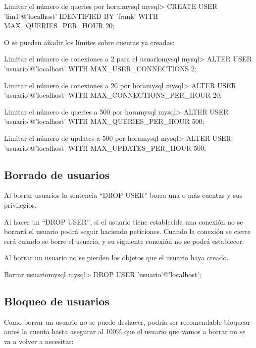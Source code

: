 \begin{mycode}{Limitar el número de queries por hora.}{mysql}{\scriptsize}
mysql> CREATE USER 'lim1'@'localhost' IDENTIFIED BY 'frank' WITH MAX_QUERIES_PER_HOUR 20;
\end{mycode}


O se pueden añadir los límites sobre cuentas ya creadas:


\begin{mycode}{Limitar el número de conexiones a 2 para el usuario}{mysql}{}
mysql> ALTER USER 'usuario'@'localhost' WITH MAX_USER_CONNECTIONS 2;
\end{mycode}

\begin{mycode}{Limitar el número de conexiones a 20 por hora}{mysql}{{\small }}
mysql> ALTER USER 'usuario'@'localhost' WITH MAX_CONNECTIONS_PER_HOUR 20;
\end{mycode}

\begin{mycode}{Limitar el número de queries a 500 por hora}{mysql}{}
mysql> ALTER USER 'usuario'@'localhost' WITH MAX_QUERIES_PER_HOUR 500;
\end{mycode}


\begin{mycode}{Limitar el número de updates a 500 por hora}{mysql}{}
mysql> ALTER USER 'usuario'@'localhost' WITH MAX_UPDATES_PER_HOUR 500;
\end{mycode}


\subsection{Borrado de usuarios}
Al borrar usuarios la sentencia “DROP USER” borra una o más cuentas y sus privilegios.

Al hacer un “DROP USER”, si el usuario tiene establecida una conexión no se borrará el usuario podrá seguir haciendo peticiones. Cuando la conexión se cierre será cuando se borre el usuario, y su siguiente conexión no se podrá establecer.

Al borrar un usuario no se pierden los objetos que el usuario haya creado.

\begin{mycode}{Borrar usuario}{mysql}{}
mysql> DROP USER 'usuario'@'localhost';
\end{mycode}


\subsection{Bloqueo de usuarios}
Como borrar un usuario no se puede deshacer, podría ser recomendable bloquear antes la cuenta hasta asegurar al 100\% que el usuario que vamos a borrar no se va a volver a necesitar:


